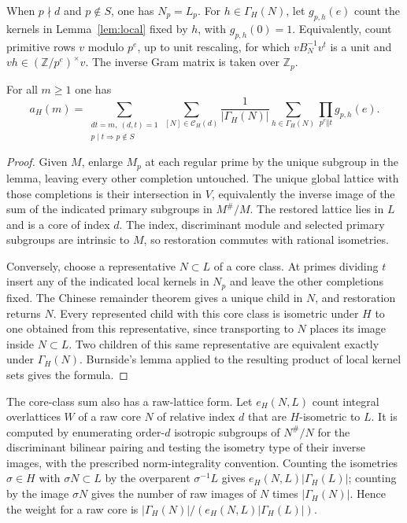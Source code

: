 When $p\nmid d$ and $p\notin S$, one has $N_p=L_p$. For
$h\in\Gamma_H(N)$, let $g_{p,h}(e)$ count the kernels in
Lemma~\ref{lem:local} fixed by $h$, with $g_{p,h}(0)=1$.
Equivalently, count primitive rows $v$ modulo $p^e$, up to unit
rescaling, for which $v B_{N}^{-1}v^t$ is a unit and
$vh\in(\mathbb Z/p^e)^\times v$. The inverse Gram matrix is taken
over $\mathbb Z_p$.
\begin{theorem}\label{th:core}
For all $m\ge1$ one has
\[
 a_H(m)=
 \sum_{\substack{dt=m,\ (d,t)=1\\p\mid t\Rightarrow p\notin S}}
 \sum_{[N]\in\mathcal C_H(d)}
 \frac1{|\Gamma_H(N)|}\sum_{h\in\Gamma_H(N)}
       \prod_{p^e\Vert t}g_{p,h}(e).
\]
\end{theorem}
\begin{proof}
Given $M$, enlarge $M_p$ at each regular prime by the unique subgroup in the lemma, leaving every other completion untouched. The unique global lattice with those completions is their intersection in $V$, equivalently the inverse image of the sum of the indicated primary subgroups in $M^\#/M$. The restored lattice lies in $L$ and is a core of index $d$.
The index, discriminant module and selected primary subgroups are
intrinsic to $M$, so restoration commutes with rational isometries.

Conversely, choose a representative $N\subset L$ of a core class. At primes dividing $t$ insert any of the indicated local kernels in $N_p$ and leave the other completions fixed. The Chinese remainder theorem gives a unique child in $N$, and restoration returns $N$. Every represented child with this core class is isometric under $H$ to one obtained from this representative, since transporting to $N$ places its image inside $N\subset L$. Two children of this same representative are equivalent exactly under $\Gamma_H(N)$. Burnside's lemma applied to the resulting product of local kernel sets gives the formula.
\end{proof}

The core-class sum also has a raw-lattice form. Let
$e_H(N,L)$ count integral overlattices $W$ of a raw core $N$ of
relative index $d$ that are $H$-isometric to $L$. It is computed by enumerating order-$d$ isotropic subgroups of
$N^\#/N$ for the discriminant bilinear pairing and testing the
isometry type of their inverse images, with the prescribed
norm-integrality convention. Counting the isometries $\sigma\in H$ with $\sigma N\subset L$
by the overparent $\sigma^{-1}L$ gives
$e_H(N,L)|\Gamma_H(L)|$; counting by the image $\sigma N$ gives the
number of raw images of $N$ times $|\Gamma_H(N)|$.
Hence the weight for a raw core is
$|\Gamma_H(N)|/(e_H(N,L)|\Gamma_H(L)|)$.

